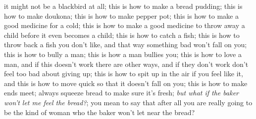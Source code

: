 \documentclass{article}
\begin{document}
it might not be a blackbird at all; this is how to make a bread pudding; this
is how to make doukona; this is how to make pepper pot; this is how to make a
good medicine for a cold; this is how to make a good medicine to throw away a
child before it even becomes a child; this is how to catch a fish; this is how
to throw back a fish you don’t like, and that way something bad won’t fall on
you; this is how to bully a man; this is how a man bullies you; this is how to
love a man, and if this doesn’t work there are other ways, and if they don’t
work don’t feel too bad about giving up; this is how to spit up in the air if
you feel like it, and this is how to move quick so that it doesn’t fall on you;
this is how to make ends meet; always squeeze bread to make sure it’s fresh;
\emph{but what if the baker won’t let me feel the bread?}; you mean to say that
after all you are really going to be the kind of woman who the baker won’t let
near the bread? 
\end{document}
